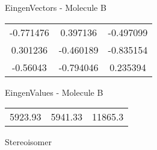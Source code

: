 \begin{multicols}{2}
\begin{center}
\vtab
 EingenVectors - Molecule B     \\
\vtab
\begin{tabular}{|c c c|}
-0.771476	 & 	0.397136	 & 	-0.497099	 \\
0.301236	 & 	-0.460189	 & 	-0.835154	 \\
-0.56043	 & 	-0.794046	 & 	0.235394
\end{tabular}

\vtab
 EingenValues - Molecule B     \\
\vtab
\begin{tabular}{|c c c|}
5923.93	 & 	5941.33	 & 	11865.3	 \\
\end{tabular}

\end{center}
\end{multicols}
\begin{center}
\vtab
\vtab
\textcolor{NavyBlue}{\Large Stereoisomer}
\end{center}

 \newpage

